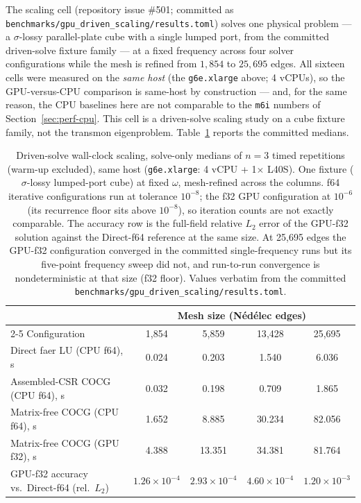 \documentclass{anvil-paper}
\begin{document}
The scaling cell (repository issue \#501; committed as
\texttt{benchmarks/gpu\_driven\_scaling/results.toml}) solves one physical
problem --- a $\sigma$-lossy parallel-plate cube with a single lumped
port, from the committed driven-solve fixture family --- at a fixed
frequency across four solver configurations while the mesh is refined
from $1{,}854$ to $25{,}695$ edges. All sixteen cells were measured on the
\emph{same host} (the \texttt{g6e.xlarge} above; 4 vCPUs), so the
GPU-versus-CPU comparison is same-host by construction --- and, for the
same reason, the CPU baselines here are not comparable to the
\texttt{m6i} numbers of Section~\ref{sec:perf-cpu}. This cell is a
driven-solve scaling study on a cube fixture family, not the transmon
eigenproblem. Table~\ref{tab:gpu} reports the committed medians.

\begin{table}[t]
  \centering
  \caption{Driven-solve wall-clock scaling, solve-only medians of $n = 3$
  timed repetitions (warm-up excluded), same host (\texttt{g6e.xlarge}:
  4 vCPU + 1$\times$ L40S). One fixture ($\sigma$-lossy lumped-port cube)
  at fixed $\omega$, mesh-refined across the columns. f64 iterative
  configurations run at tolerance $10^{-8}$; the f32 GPU configuration at
  $10^{-6}$ (its recurrence floor sits above $10^{-8}$), so iteration
  counts are not exactly comparable. The accuracy row is the full-field
  relative $L_2$ error of the GPU-f32 solution against the Direct-f64
  reference at the same size. At 25{,}695 edges the GPU-f32 configuration
  converged in the committed single-frequency runs but its five-point
  frequency sweep did not, and run-to-run convergence is nondeterministic
  at that size (f32 floor). Values verbatim from the committed
  \texttt{benchmarks/gpu\_driven\_scaling/results.toml}.}
  \label{tab:gpu}
  \small
  \setlength{\tabcolsep}{5pt}
  \begin{tabular}{@{}lcccc@{}}
    \toprule
    & \multicolumn{4}{c}{Mesh size (N\'ed\'elec edges)} \\
    \cmidrule(l){2-5}
    Configuration & 1{,}854 & 5{,}859 & 13{,}428 & 25{,}695 \\
    \midrule
    Direct faer LU (CPU f64), s & 0.024 & 0.203 & 1.540 & 6.036 \\
    Assembled-CSR COCG (CPU f64), s & 0.032 & 0.198 & 0.709 & 1.865 \\
    Matrix-free COCG (CPU f64), s & 1.652 & 8.885 & 30.234 & 82.056 \\
    Matrix-free COCG (GPU f32), s & 4.388 & 13.351 & 34.381 & 81.764 \\
    \midrule
    GPU-f32 accuracy vs.\ Direct-f64 (rel.\ $L_2$) &
      $1.26\times10^{-4}$ & $2.93\times10^{-4}$ &
      $4.60\times10^{-4}$ & $1.20\times10^{-3}$ \\
    \bottomrule
  \end{tabular}
\end{table}
\end{document}
